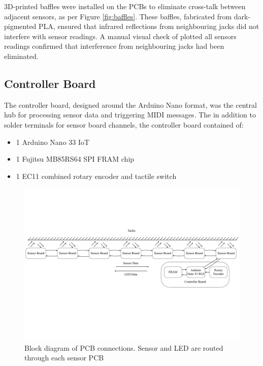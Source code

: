 3D-printed baffles were installed on the PCBs to eliminate cross-talk between adjacent sensors, as per Figure \ref{fig:baffles}. These baffles, fabricated from dark-pigmented PLA, ensured that infrared reflections from neighbouring jacks did not interfere with sensor readings. A manual visual check of plotted all sensors readings confirmed that interference from neighbouring jacks had been eliminated.

\subsection{Controller Board}\label{controller-board}

The controller board, designed around the Arduino Nano format, was the central hub for processing sensor data and triggering MIDI messages. The in addition to solder terminals for sensor board channels, the controller board contained of:

\begin{itemize}
    \item 1 Arduino Nano 33 IoT
    \item 1 Fujitsu MB85RS64 SPI FRAM chip
    \item 1 EC11 combined rotary encoder and tactile switch
\end{itemize}

\begin{figure}
    \centering
    \includegraphics[width=\linewidth]{src/images/block-diagram.pdf}
    \caption{Block diagram of PCB connections. Sensor and LED are routed through each sensor PCB}
    \label{fig:system-block-diagram}
\end{figure}

